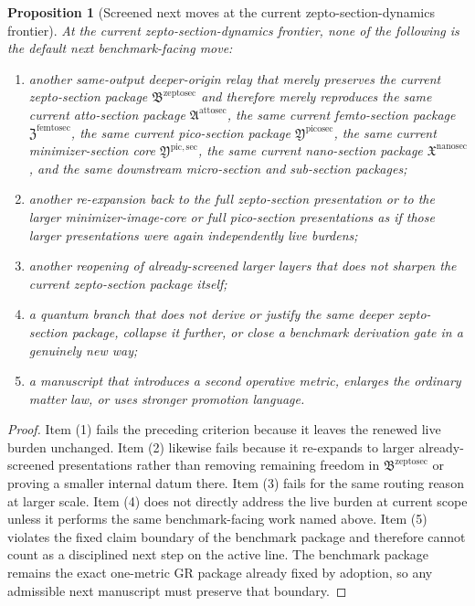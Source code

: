 \documentclass[11pt]{article}
\newcommand{\NanoSectionPackage}{\mathfrak X^{\mathrm{nanosec}}}
\newcommand{\PicoSectionPackage}{\mathfrak Y^{\mathrm{picosec}}}
\newcommand{\PicoMinSectionCore}{\mathfrak Y^{\mathrm{pic,sec}}}
\newcommand{\FemtoSectionPackage}{\mathfrak Z^{\mathrm{femtosec}}}
\newcommand{\AttoSectionPackage}{\mathfrak A^{\mathrm{attosec}}}
\newcommand{\ZeptoSectionPackage}{\mathfrak B^{\mathrm{zeptosec}}}
\newtheorem{proposition}{Proposition}
\begin{document}
\begin{proposition}[Screened next moves at the current zepto-section-dynamics frontier]
At the current zepto-section-dynamics frontier, none of the following is the default next benchmark-facing move:
\begin{enumerate}
    \item another same-output deeper-origin relay that merely preserves the current zepto-section package \(\ZeptoSectionPackage\) and therefore merely reproduces the same current atto-section package \(\AttoSectionPackage\), the same current femto-section package \(\FemtoSectionPackage\), the same current pico-section package \(\PicoSectionPackage\), the same current minimizer-section core \(\PicoMinSectionCore\), the same current nano-section package \(\NanoSectionPackage\), and the same downstream micro-section and sub-section packages;
    \item another re-expansion back to the full zepto-section presentation or to the larger minimizer-image-core or full pico-section presentations as if those larger presentations were again independently live burdens;
    \item another reopening of already-screened larger layers that does not sharpen the current zepto-section package itself;
    \item a quantum branch that does not derive or justify the same deeper zepto-section package, collapse it further, or close a benchmark derivation gate in a genuinely new way;
    \item a manuscript that introduces a second operative metric, enlarges the ordinary matter law, or uses stronger promotion language.
\end{enumerate}
\end{proposition}

\begin{proof}
Item (1) fails the preceding criterion because it leaves the renewed live burden unchanged. Item (2) likewise fails because it re-expands to larger already-screened presentations rather than removing remaining freedom in \(\ZeptoSectionPackage\) or proving a smaller internal datum there. Item (3) fails for the same routing reason at larger scale. Item (4) does not directly address the live burden at current scope unless it performs the same benchmark-facing work named above. Item (5) violates the fixed claim boundary of the benchmark package and therefore cannot count as a disciplined next step on the active line. The benchmark package remains the exact one-metric GR package already fixed by adoption, so any admissible next manuscript must preserve that boundary.
\end{proof}
\end{document}
